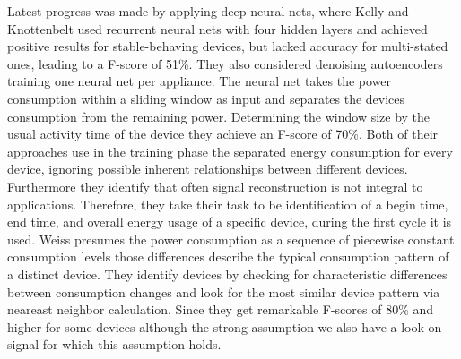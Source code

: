 \documentclass{article}
\begin{document}
Latest progress was made by applying deep neural nets, where Kelly and Knottenbelt \cite{Kelly} used recurrent neural 
nets with four hidden layers and achieved positive results for stable-behaving devices, but lacked accuracy for multi-stated 
ones, leading to a F-score of 51\%. They also considered denoising autoencoders training one neural net per appliance. 
The neural net takes the power consumption within a sliding window as input and separates the devices consumption from 
the remaining power. Determining the window size by the usual activity time of the device they achieve an F-score of 70\%. 
Both of their approaches use in the training phase the separated energy consumption for every device, ignoring possible inherent 
relationships between different devices. Furthermore they identify that often signal reconstruction is not integral to applications.
Therefore, they take their task to be identification of a begin time, end time, and overall energy usage of a specific device, 
during the first cycle it is used.
Weiss \cite{Weiss} presumes the power consumption as a sequence of piecewise constant consumption levels those differences 
describe the typical consumption pattern of a distinct device. They identify devices by checking for characteristic 
differences 
between consumption changes and look for the most similar device pattern via neareast neighbor calculation. Since they get remarkable 
F-scores of 80\% and higher for some devices although the strong assumption we also have a look on signal for which this assumption holds.
\end{document}
